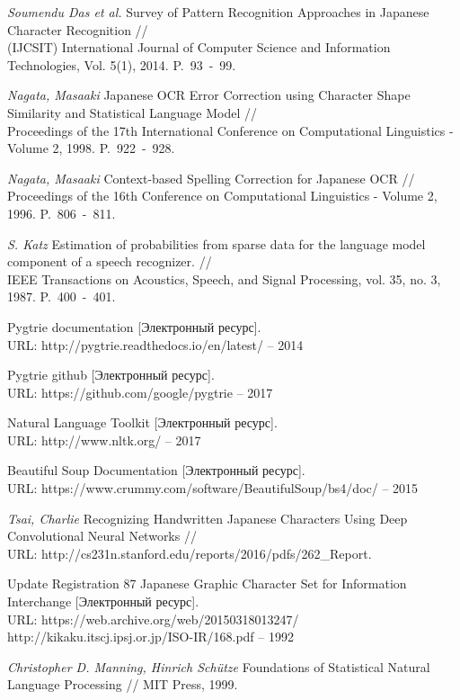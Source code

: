 
\begin{thebibliography}{00}
	
\textit{Soumendu Das et al.} Survey of Pattern Recognition Approaches in Japanese Character Recognition //\\
(IJCSIT) International Journal of Computer Science and Information Technologies, Vol. 5(1), 2014. P.~93~-~99.

\textit{Nagata, Masaaki} Japanese OCR Error Correction using Character Shape Similarity and Statistical Language Model //\\
Proceedings of the 17th International Conference on Computational Linguistics - Volume 2, 1998. P.~922~-~928.

\textit{Nagata, Masaaki} Context-based Spelling Correction for Japanese OCR //\\
Proceedings of the 16th Conference on Computational Linguistics - Volume 2, 1996. P.~806~-~811.

\textit{S. Katz} Estimation of probabilities from sparse data for the language model component of a speech recognizer. //\\
IEEE Transactions on Acoustics, Speech, and Signal Processing, vol. 35, no. 3, 1987. P.~400~-~401.

 Pygtrie documentation [Электронный ресурс]. \\ URL: http://pygtrie.readthedocs.io/en/latest/ -- 2014

 Pygtrie github [Электронный ресурс]. \\ URL: https://github.com/google/pygtrie -- 2017

 Natural Language Toolkit [Электронный ресурс]. \\ URL: http://www.nltk.org/ -- 2017

 Beautiful Soup Documentation [Электронный ресурс]. \\ URL: https://www.crummy.com/software/BeautifulSoup/bs4/doc/ -- 2015

\textit{Tsai, Charlie} Recognizing Handwritten Japanese Characters Using Deep Convolutional Neural Networks //\\
URL: http://cs231n.stanford.edu/reports/2016/pdfs/262\_Report.

Update Registration 87 Japanese Graphic Character Set for Information Interchange [Электронный ресурс]. \\
URL: https://web.archive.org/web/20150318013247/\\http://kikaku.itscj.ipsj.or.jp/ISO-IR/168.pdf -- 1992

\textit{Christopher D. Manning, Hinrich Schütze} Foundations of Statistical Natural Language Processing //
MIT Press, 1999.

\end{thebibliography}